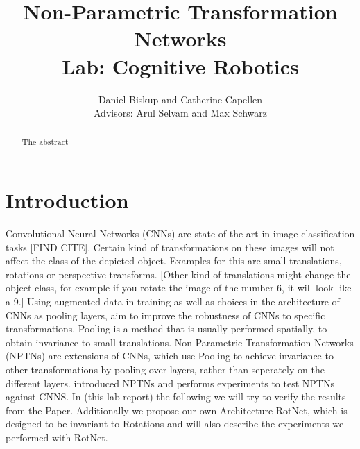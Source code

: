 \documentclass{llncs}
\begin{document}
%
\frontmatter          %
%
\pagestyle{headings}  %
%
\mainmatter              %
%
\title{Non-Parametric Transformation Networks \\Lab: Cognitive Robotics}
%
%  
%
\author{Daniel Biskup and Catherine Capellen
 \\Advisors: Arul Selvam and Max Schwarz}
%
%
%

\maketitle              %

\begin{abstract}
The abstract 
\end{abstract}
%

\section{Introduction}
Convolutional Neural Networks (CNNs) are state of the art in image classification tasks [FIND CITE]. Certain kind of transformations on these images will not affect the class of the depicted object. 
Examples for this are small translations, rotations or perspective transforms. [Other kind of translations might change the object class, for example if you rotate the image of the number 6, it will look like a 9.] 
Using augmented data in training as well as choices in the architecture of CNNs as pooling layers, aim to improve the robustness of CNNs to specific transformations. 
Pooling is a method that is usually performed spatially, to obtain invariance to small translations. 
Non-Parametric Transformation Networks (NPTNs) are extensions of CNNs, which use Pooling to achieve invariance to other transformations by pooling over layers, rather than seperately on the different layers.
\cite{NPTN} introduced NPTNs and performs experiments to test NPTNs against CNNS. In (this lab report) the following we will try to verify the results from the Paper. 
Additionally we propose our own Architecture RotNet, which is designed to be invariant to Rotations and will also describe the experiments we performed with RotNet. 
\end{document}
